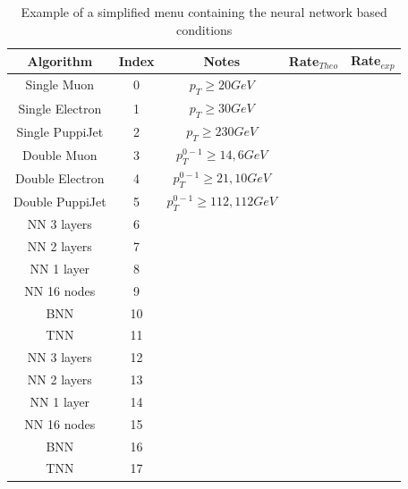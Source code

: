 \documentclass[../../main.tex]{subfiles}
\begin{document}
\begin{table}[h]
    \centering
    \begin{tabular}{|c|c|c|c|c|}
    \hline
    Algorithm & Index & Notes & Rate$_{Theo}$ & Rate$_{exp}$ \\
    \hline
    Single Muon      &0& $p_T \geq 20GeV$            & & \\
    Single Electron  &1& $p_T \geq 30GeV$            & & \\
    Single PuppiJet  &2& $p_T \geq 230GeV$           & & \\
    Double Muon      &3& $p_T^{0-1} \geq 14,6GeV$    & & \\
    Double Electron  &4& $p_T^{0-1} \geq 21,10GeV$   & & \\
    Double PuppiJet  &5& $p_T^{0-1} \geq 112,112GeV$ & & \\
    NN 3 layers      &6&&& \\
    NN 2 layers      &7&&& \\
    NN 1 layer       &8&&& \\
    NN 16 nodes      &9&&& \\
    BNN              &10&&&\\
    TNN              &11&&& \\
    NN 3 layers      &12&&& \\
    NN 2 layers      &13&&& \\
    NN 1 layer       &14&&& \\
    NN 16 nodes      &15&&& \\
    BNN              &16&&&\\
    TNN              &17&&& \\
    \hline
    \end{tabular}
    \caption{Example of a simplified menu containing the neural network based conditions}
    \label{tab:test_algos}
\end{table}

    
\end{document}

